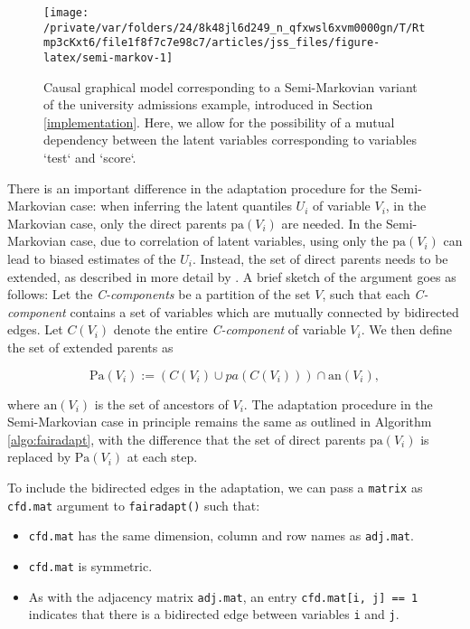 \documentclass[
  nojss]{jss}
\providecommand{\tightlist}{%
  \setlength{\itemsep}{0pt}\setlength{\parskip}{0pt}}
\begin{document}
\begin{CodeChunk}
\begin{figure}

{\centering \texttt{[image: /private/var/folders/24/8k48jl6d249\_n\_qfxwsl6xvm0000gn/T/Rtmp3cKxt6/file1f8f7c7e98c7/articles/jss\_files/figure-latex/semi-markov-1]} 

}

\caption[Causal graphical model corresponding to a Semi-Markovian variant of the university admissions example, introduced in Section \ref{implementation}]{Causal graphical model corresponding to a Semi-Markovian variant of the university admissions example, introduced in Section \ref{implementation}. Here, we allow for the possibility of a mutual dependency between the latent variables corresponding to variables `test` and `score`.}\label{fig:semi-markov}
\end{figure}
\end{CodeChunk}

There is an important difference in the adaptation procedure for the
Semi-Markovian case: when inferring the latent quantiles \(U_i\) of
variable \(V_i\), in the Markovian case, only the direct parents
\(\mathrm{pa}(V_i)\) are needed. In the Semi-Markovian case, due to
correlation of latent variables, using only the \(\mathrm{pa}(V_i)\) can
lead to biased estimates of the \(U_i\). Instead, the set of direct
parents needs to be extended, as described in more detail by
\citet{tian2002general}. A brief sketch of the argument goes as follows:
Let the \emph{C-components} be a partition of the set \(V\), such that
each \emph{C-component} contains a set of variables which are mutually
connected by bidirected edges. Let \(C(V_i)\) denote the entire
\emph{C-component} of variable \(V_i\). We then define the set of
extended parents as

\[\mathrm{Pa}(V_i) := (C(V_i) \cup pa(C(V_i))) \cap \mathrm{an}(V_i),\]

where \(\mathrm{an}(V_i)\) is the set of ancestors of \(V_i\). The
adaptation procedure in the Semi-Markovian case in principle remains the
same as outlined in Algorithm \ref{algo:fairadapt}, with the difference
that the set of direct parents \(\mathrm{pa}(V_i)\) is replaced by
\(\mathrm{Pa}(V_i)\) at each step.

To include the bidirected edges in the adaptation, we can pass a
\texttt{matrix} as \texttt{cfd.mat} argument to \texttt{fairadapt()}
such that:

\begin{itemize}
\tightlist
\item
  \texttt{cfd.mat} has the same dimension, column and row names as
  \texttt{adj.mat}.
\item
  \texttt{cfd.mat} is symmetric.
\item
  As with the adjacency matrix \texttt{adj.mat}, an entry
  \texttt{cfd.mat{[}i,\ j{]}\ ==\ 1} indicates that there is a
  bidirected edge between variables \texttt{i} and \texttt{j}.
\end{itemize}
\end{document}
